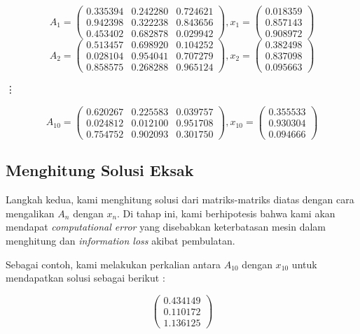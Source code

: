 \documentclass[11pt]{article}
\begin{document}
\vspace{3mm}
\[
A_1 = \begin{pmatrix}
0.335394 & 0.242280 & 0.724621 \\
0.942398 & 0.322238 & 0.843656 \\
0.453402 & 0.682878 & 0.029942
\end{pmatrix}
, x_1 = \begin{pmatrix}
0.018359 \\
0.857143 \\
0.908972
\end{pmatrix}
\]
\[
A_2 = \begin{pmatrix}
0.513457 & 0.698920 & 0.104252 \\
0.028104 & 0.954041 & 0.707279 \\
0.858575 & 0.268288 & 0.965124
\end{pmatrix}
, x_2 = \begin{pmatrix}
0.382498 \\
0.837098 \\
0.095663
\end{pmatrix}
\]
\centerline{\vdots}
\[
A_{10} = \begin{pmatrix}
0.620267 & 0.225583 & 0.039757 \\
0.024812 & 0.012100 & 0.951708 \\
0.754752 & 0.902093 & 0.301750
\end{pmatrix}
, x_{10} = \begin{pmatrix}
0.355533 \\
0.930304 \\
0.094666
\end{pmatrix}
\]

\vspace{3mm}

\subsection{Menghitung Solusi Eksak}
Langkah kedua, kami menghitung solusi dari matriks-matriks diatas dengan cara mengalikan $A_n$ dengan $x_n$. Di tahap ini, kami berhipotesis bahwa kami akan mendapat \textit{computational error} yang disebabkan keterbatasan mesin dalam menghitung dan \textit{information loss} akibat pembulatan.

Sebagai contoh, kami melakukan perkalian antara $A_{10}$ dengan $x_{10}$ untuk mendapatkan solusi sebagai berikut :

\vspace{3mm}
\[
\begin{pmatrix}
0.434149 \\
0.110172 \\
1.136125
\end{pmatrix}
\]
\end{document}
